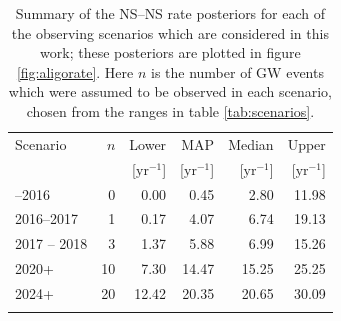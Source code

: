 \documentclass[twocolumn]{aastex61}
\newcommand{\yr}{\mathrm{yr}}
\newcommand{\BNS}{\ac{NS}--\ac{NS}\xspace}
\begin{document}
\begin{table}
\begin{center}
  \begin{tabular}{lrrrrr}
    \toprule
    Scenario &    $n$ & Lower       & MAP             & Median          & Upper\\
             &        & [$\yr^{-1}$] & [$\yr^{-1}$]    & [$\yr^{-1}$]    & [$\yr^{-1}$]  \\
    \colrule
    2015--2016 & 0   & 0.00	 & 0.45	 & 2.80	 & 11.98	\\
    2016--2017 & 1   & 0.17	 & 4.07	 & 6.74	 & 19.13	\\
    2017 -- 2018 & 3 & 1.37	 & 5.88	 & 6.99	 & 15.26 \\	
    2020+ & 10 &7.30	 & 14.47	 & 15.25	 & 25.25	\\
    2024+ & 20 & 12.42	 & 20.35	 & 20.65	 & 30.09	\\
    \botrule
\end{tabular}
\end{center}

\caption{Summary of the \BNS rate posteriors for each of the observing
  scenarios which are considered in this work; these posteriors are plotted
  in figure \ref{fig:aligorate}. Here $n$ is the number of \ac{GW} events which were assumed to be observed in each scenario, chosen from the ranges in table \ref{tab:scenarios}.
  \label{tab:rateposteriors}
}
\end{table}
\end{document}
